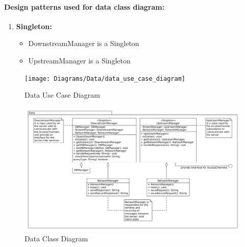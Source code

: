 \documentclass[11pt]{article}
\begin{document}
	 \paragraph{Design patterns used for data class diagram: }
		\begin{enumerate}
			\item \textbf{Singleton:}
			\begin{itemize}
				\item DownstreamManager is a Singleton
				\item UpstreamManager is a Singleton
			\end{itemize}	
		
		\end{enumerate}
	\begin{figure}[!h]
        \centering
        \texttt{[image: Diagrams/Data/data\_use\_case\_diagram]}
        \caption{Data Use Case Diagram}
        \label{fig:data_use_case}
    \end{figure}
    \begin{figure}[!h]
        \centering
        \includegraphics[width=\textwidth]{Diagrams/Data/data_class_diagram}
        \caption{Data Class Diagram}
        \label{fig:data_class}
    \end{figure}
\end{document}

